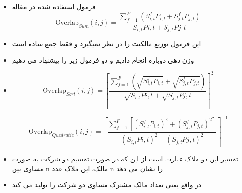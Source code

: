 \documentclass[12pt, a4paper]{article}
\begin{document}
\begin{appendices}
\section{}
\label{ModifiedMeasure}
\begin{itemize}
	\item 
	فرمول استفاده شده در مقاله
		\begin{equation}
		\text{Overlap}_{Sum}(i, j) = \frac{\sum_{f = 1}^{F} (S^f_{i,t}P_{i,t}+S^f_{j,t}P_{j,t})}{S_{i,t}P{i,t} + S_{j,t}P{j,t}}
		\label{Sum}
	\end{equation}
	\item 
	این فرمول توزیع مالکیت را در نظر نمیگیرد و فقط جمع ساده است
	\item
وزن دهی دوباره انجام دادیم و دو فرمول زیر را پیشنهاد می دهیم	
	\item

\begin{equation}
	\text{Overlap}_{Sqrt}(i, j) =  [\frac{\sum_{f =1}^{F}(\sqrt{S^f_{i,t}P_{i,t}}+\sqrt{S^f_{j,t}P_{j,t}})}{\sqrt{S_{i,t}P{i,t}} + \sqrt{S_{j,t}P{j,t}}}]^2 
	\label{sqrt}
\end{equation}

\begin{equation}
	\text{Overlap}_{Quadratic}(i, j) =  [{\frac{\sum_{f = 1}^{F}[(S^f_{i,t}P_{i,t})^2+(S^f_{j,t}P_{j,t})^2]}{(S_{i,t}P{i,t})^2 + (S_{j,t}P{j,t})^2}}]^{-1}
	\label{Quadratic}
\end{equation}
	\item
تفسیر این دو ملاک عبارت است از این که در صورت تقسیم دو شرکت به صورت مساوی بین n مالک، این ملاک عدد n را نشان می دهد
	\item
در واقع یعنی تعداد مالک مشترک مساوی دو شرکت را تولید می کند
\end{itemize}


\end{appendices}
\end{document}
